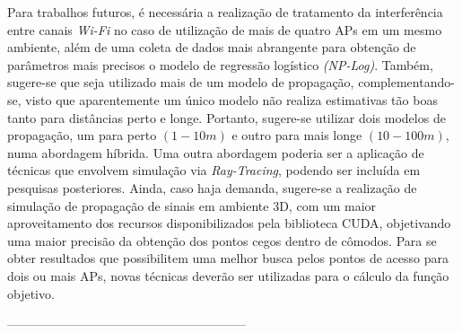 \documentclass[
	12pt,				%
	twoside,			%
	a4paper,			%
	english,			%
	french,				%
	spanish,			%
	brazil				%
	]{abntex2}
\begin{document}
Para trabalhos futuros, é necessária a realização de tratamento da
interferência entre canais \emph{Wi-Fi} no caso de utilização de mais de
quatro APs em um mesmo ambiente, além de uma coleta de dados mais
abrangente para obtenção de parâmetros mais precisos o modelo de
regressão logístico \emph{(NP-Log)}. Também, sugere-se que seja
utilizado mais de um modelo de propagação, complementando-se, visto que
aparentemente um único modelo não realiza estimativas tão boas tanto
para distâncias perto e longe. Portanto, sugere-se utilizar dois modelos
de propagação, um para perto \((1-10 m)\) e outro para mais longe
\((10-100 m)\), numa abordagem híbrida. Uma outra abordagem poderia ser
a aplicação de técnicas que envolvem simulação via \emph{Ray-Tracing},
podendo ser incluída em pesquisas posteriores. Ainda, caso haja demanda,
sugere-se a realização de simulação de propagação de sinais em ambiente
3D, com um maior aproveitamento dos recursos disponibilizados pela
biblioteca CUDA, objetivando uma maior precisão da obtenção dos pontos
cegos dentro de cômodos. Para se obter resultados que possibilitem uma
melhor busca pelos pontos de acesso para dois ou mais APs, novas
técnicas deverão ser utilizadas para o cálculo da função objetivo.

---------------------------------------------------------

\postextual

\postextual



\end{document}
